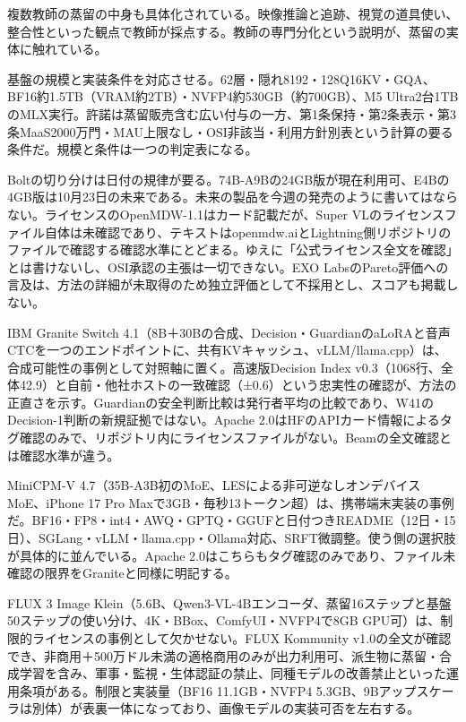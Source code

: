 \documentclass[lualatex,a4paper,10pt]{jlreq}
\begin{document}
複数教師の蒸留の中身も具体化されている。映像推論と追跡、視覚の道具使い、整合性といった観点で教師が採点する。教師の専門分化という説明が、蒸留の実体に触れている。
\cite{B21,B72,B22,B20}


基盤の規模と実装条件を対応させる。62層・隠れ8192・128Q16KV・GQA、BF16約1.5TB（VRAM約2TB）・NVFP4約530GB（約700GB）、M5 Ultra2台1TBのMLX実行。許諾は蒸留販売含む広い付与の一方、第1条保持・第2条表示・第3条MaaS2000万門・MAU上限なし・OSI非該当・利用方針別表という計算の要る条件だ。規模と条件は一つの判定表になる。
\cite{B14,B70,B15,B13,B71}


Boltの切り分けは日付の規律が要る。74B-A9Bの24GB版が現在利用可、E4Bの4GB版は10月23日の未来である。未来の製品を今週の発売のように書いてはならない。ライセンスのOpenMDW-1.1はカード記載だが、Super VLのライセンスファイル自体は未確認であり、テキストはopenmdw.aiとLightning側リポジトリのファイルで確認する確認水準にとどまる。ゆえに「公式ライセンス全文を確認」とは書けないし、OSI承認の主張は一切できない。EXO LabsのPareto評価への言及は、方法の詳細が未取得のため独立評価として不採用とし、スコアも掲載しない。
\cite{B21,B72,B22,B20}


IBM Granite Switch 4.1（8B＋30Bの合成、Decision・GuardianのaLoRAと音声CTCを一つのエンドポイントに、共有KVキャッシュ、vLLM/llama.cpp）は、合成可能性の事例として対照軸に置く。高速版Decision Index v0.3（1068行、全体42.9）と自前・他社ホストの一致確認（±0.6）という忠実性の確認が、方法の正直さを示す。Guardianの安全判断比較は発行者平均の比較であり、W41のDecision-1判断の新規証拠ではない。Apache 2.0はHFのAPIカード情報によるタグ確認のみで、リポジトリ内にライセンスファイルがない。Beamの全文確認とは確認水準が違う。
\cite{B24,B73,B23,B25}


MiniCPM-V 4.7（35B-A3B初のMoE、LESによる非可逆なしオンデバイスMoE、iPhone 17 Pro Maxで3GB・毎秒13トークン超）は、携帯端末実装の事例だ。BF16・FP8・int4・AWQ・GPTQ・GGUFと日付つきREADME（12日・15日）、SGLang・vLLM・llama.cpp・Ollama対応、SRFT微調整。使う側の選択肢が具体的に並んでいる。Apache 2.0はこちらもタグ確認のみであり、ファイル未確認の限界をGraniteと同様に明記する。
\cite{B27,B74,B26}


FLUX 3 Image Klein（5.6B、Qwen3-VL-4Bエンコーダ、蒸留16ステップと基盤50ステップの使い分け、4K・BBox、ComfyUI・NVFP4で8GB GPU可）は、制限的ライセンスの事例として欠かせない。FLUX Kommunity v1.0の全文が確認でき、非商用＋500万ドル未満の適格商用のみが出力利用可、派生物に蒸留・合成学習を含み、軍事・監視・生体認証の禁止、同種モデルの改善禁止といった運用条項がある。制限と実装量（BF16 11.1GB・NVFP4 5.3GB、9Bアップスケーラは別体）が表裏一体になっており、画像モデルの実装可否を左右する。
\cite{B29,B28,B30}
\end{document}
